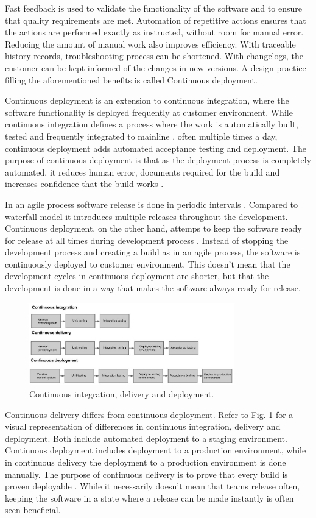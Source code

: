 \documentclass[english]{tktltiki2}
\theoremstyle{definition}
\theoremstyle{remark}
\begin{document}
Fast feedback is used to validate the functionality of the software and to ensure that quality requirements are met. Automation of repetitive actions ensures that the actions are performed exactly as instructed, without room for manual error. Reducing the amount of manual work also improves efficiency. With traceable history records, troubleshooting process can be shortened. With changelogs, the customer can be kept informed of the changes in new versions. A design practice filling the aforementioned benefits is called Continuous deployment.

Continuous deployment is an extension to continuous integration, where the software functionality is deployed frequently at customer environment. While continuous integration defines a process where the work is automatically built, tested and frequently integrated to mainline \cite{fowler2006continuous}, often multiple times a day, continuous deployment adds automated acceptance testing and deployment. The purpose of continuous deployment is that as the deployment process is completely automated, it reduces human error, documents required for the build and increases confidence that the build works \cite{cdbook}. 

In an agile process software release is done in periodic intervals \cite{cockburn2002agile}. Compared to waterfall model it introduces multiple releases throughout the development. Continuous deployment, on the other hand, attemps to keep the software ready for release at all times during development process \cite{cdbook}. Instead of stopping the development process and creating a build as in an agile process, the software is continuously deployed to customer environment. This doesn't mean that the development cycles in continuous deployment are shorter, but that the development is done in a way that makes the software always ready for release.
\begin{figure}[h]
	\centering
	\includegraphics[width=3.5in]{rtvd.jpg}
	\caption{Continuous integration, delivery and deployment.}
	\label{fig1}
\end{figure}
Continuous delivery differs from continuous deployment. Refer to Fig. \ref{fig1} for a visual representation of differences in continuous integration, delivery and deployment. Both include automated deployment to a staging environment. Continuous deployment includes deployment to a production environment, while in continuous delivery the deployment to a production environment is done manually. The purpose of continuous delivery is to prove that every build is proven deployable \cite{cdbook}. While it necessarily doesn't mean that teams release often, keeping the software in a state where a release can be made instantly is often seen beneficial.
\end{document}

